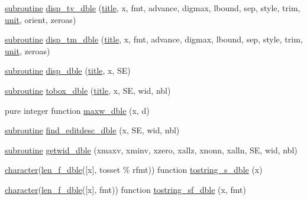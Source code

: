 \begin{DoxyCompactItemize}
\item 
\hyperlink{M__stopwatch_83_8txt_acfbcff50169d691ff02d4a123ed70482}{subroutine} \hyperlink{namespacem__display_a0082afc2c20de6418d61567d807a070b}{disp\+\_\+tv\+\_\+dble} (\hyperlink{print__watch_83_8txt_a15b5bd21156bb9fca6a755ab8c029a9c}{title}, x, fmt, advance, digmax, lbound, sep, style, trim, \hyperlink{M__stopwatch_83_8txt_a5cbef30eb7c0d734bd82f5a7ebea9aa7}{unit}, orient, zeroas)
\item 
\hyperlink{M__stopwatch_83_8txt_acfbcff50169d691ff02d4a123ed70482}{subroutine} \hyperlink{namespacem__display_a32a20b8679522732e464347be0e12808}{disp\+\_\+tm\+\_\+dble} (\hyperlink{print__watch_83_8txt_a15b5bd21156bb9fca6a755ab8c029a9c}{title}, x, fmt, advance, digmax, lbound, sep, style, trim, \hyperlink{M__stopwatch_83_8txt_a5cbef30eb7c0d734bd82f5a7ebea9aa7}{unit}, zeroas)
\item 
\hyperlink{M__stopwatch_83_8txt_acfbcff50169d691ff02d4a123ed70482}{subroutine} \hyperlink{namespacem__display_a2d67bfdaf90a1173d8283050594c8efa}{disp\+\_\+dble} (\hyperlink{print__watch_83_8txt_a15b5bd21156bb9fca6a755ab8c029a9c}{title}, x, SE)
\item 
\hyperlink{M__stopwatch_83_8txt_acfbcff50169d691ff02d4a123ed70482}{subroutine} \hyperlink{namespacem__display_abcff2aedbfe00eb52827b4941af59831}{tobox\+\_\+dble} (\hyperlink{print__watch_83_8txt_a15b5bd21156bb9fca6a755ab8c029a9c}{title}, x, SE, wid, nbl)
\item 
pure integer function \hyperlink{namespacem__display_a40bc69658b0fa714777f4b2b5477ee83}{maxw\+\_\+dble} (x, d)
\item 
\hyperlink{M__stopwatch_83_8txt_acfbcff50169d691ff02d4a123ed70482}{subroutine} \hyperlink{namespacem__display_a60a64829b11da65ab599a10719eea3cd}{find\+\_\+editdesc\+\_\+dble} (x, SE, wid, nbl)
\item 
\hyperlink{M__stopwatch_83_8txt_acfbcff50169d691ff02d4a123ed70482}{subroutine} \hyperlink{namespacem__display_abfcfe1ce55c2ec6aa7a261f6039a19d4}{getwid\+\_\+dble} (xmaxv, xminv, xzero, xallz, xnonn, xalln, SE, wid, nbl)
\item 
\hyperlink{option__stopwatch_83_8txt_abd4b21fbbd175834027b5224bfe97e66}{character}(\hyperlink{namespacem__display_aa013a639d5b0f7e40b627c9d712693f0}{len\+\_\+f\+\_\+dble}(\mbox{[}x\mbox{]}, tosset \% rfmt)) function \hyperlink{namespacem__display_ac0c020f1b9556f123bfea3ff29cda048}{tostring\+\_\+s\+\_\+dble} (x)
\item 
\hyperlink{option__stopwatch_83_8txt_abd4b21fbbd175834027b5224bfe97e66}{character}(\hyperlink{namespacem__display_aa013a639d5b0f7e40b627c9d712693f0}{len\+\_\+f\+\_\+dble}(\mbox{[}x\mbox{]}, fmt)) function \hyperlink{namespacem__display_a41a473fe1569b4f3b44cc3f9b1f5b1ce}{tostring\+\_\+sf\+\_\+dble} (x, fmt)

\end{DoxyCompactItemize}
